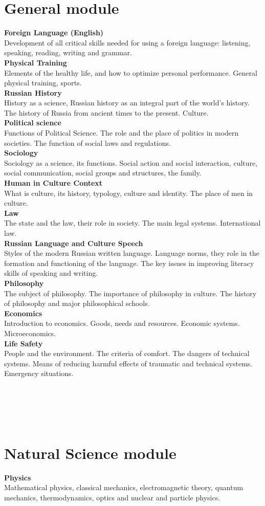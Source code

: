 \documentclass[a4paper, 12pt]{article}
\newcommand{\group}[1] {\section{#1}}
\newcommand{\discipline}[1] {\textbf{#1} \\ }
\newcommand{\desc}[1] { #1 \\ }
\begin{document}
\group{General module}

\discipline{Foreign Language (English)}
\desc{Development of all critical skills needed for using a foreign language: listening, speaking, reading, writing and grammar.}

\discipline{Physical Training}
\desc{Elements of the healthy life, and how to optimize personal performance. General physical training, sports.}

\discipline{Russian History}
\desc{History as a science, Russian history as an integral part of the world's history. The history of Russia from ancient times to the present. Culture.}

\discipline{Political science}
\desc{Functions of Political Science. The role and the place of politics in modern societies. The function of social laws and regulations.}

\discipline{Sociology}
\desc{Sociology as a science, its functions. Social action and social interaction, culture, social communication, social groups and structures, the family.}

\discipline{Human in Culture Context}
\desc{What is culture, its history, typology, culture and identity. The place of men in culture.}

\discipline{Law}
\desc{The state and the law, their role in society. The main legal systems. International law.}

\discipline{Russian Language and Culture Speech}
\desc{Styles of the modern Russian written language. Language norms, they role in the formation and functioning of the language. The key issues in improving literacy skills of speaking and writing.}

\discipline{Philosophy}
\desc{The subject of philosophy. The importance of philosophy in culture. The history of philosophy and major philosophical schools.}

\discipline{Economics}
\desc{Introduction to economics. Goods, needs and resources. Economic systems. Microeconomics.}

\discipline{Life Safety}
\desc{People and the environment. The criteria of comfort. The dangers of technical systems. Means of reducing harmful effects of traumatic and technical systems. Emergency situations.}

\

\

\

\group{Natural Science module}

\discipline{Physics}
\desc{Mathematical physics, classical mechanics, electromagnetic theory, quantum mechanics, thermodynamics, optics and nuclear and particle physics.}
\end{document}
